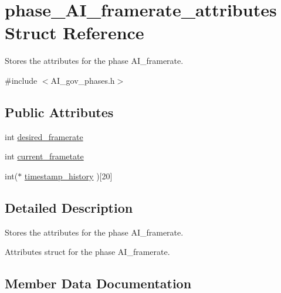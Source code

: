 \hypertarget{structphase__AI__framerate__attributes}{}\section{phase\+\_\+\+A\+I\+\_\+framerate\+\_\+attributes Struct Reference}
\label{structphase__AI__framerate__attributes}


Stores the attributes for the phase A\+I\+\_\+framerate.  




{\ttfamily \#include $<$A\+I\+\_\+gov\+\_\+phases.\+h$>$}

\subsection*{Public Attributes}
\begin{DoxyCompactItemize}
\item 
int \hyperlink{structphase__AI__framerate__attributes_af07b98dcd629f520f2187503dac84ff2}{desired\+\_\+framerate}
\item 
int \hyperlink{structphase__AI__framerate__attributes_af6a096739a087a0de642e66228cd1c63}{current\+\_\+frametate}
\item 
int($\ast$ \hyperlink{structphase__AI__framerate__attributes_a58634b71780cf24ed0d27e701530fe8f}{timestamp\+\_\+history} )\mbox{[}20\mbox{]}
\end{DoxyCompactItemize}


\subsection{Detailed Description}
Stores the attributes for the phase A\+I\+\_\+framerate. 

Attributes struct for the phase A\+I\+\_\+framerate. 

\subsection{Member Data Documentation}
\mbox{\label{structphase__AI__framerate__attributes_af6a096739a087a0de642e66228cd1c63}} 
